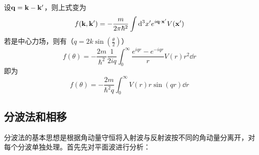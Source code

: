 \documentclass[hyperref]{ctexart}
\begin{document}
设$\vb{q}=\vb{k}-\vb{k'}$，则上式变为
\begin{equation}\label{f2}
  f(\vb{k},\vb{k'})=-\frac{m}{2\pi\hbar^2}\int\dd^3x'e^{i\vb{q}\cdot\vb{x'}}V(\vb{x'})
\end{equation}
若是中心力场，则有（$\displaystyle q=2k\sin(\frac{\theta}{2})$）
\begin{equation}\label{f3}
  f(\theta)=-\frac{2m}{\hbar^2}\frac{1}{2iq}\int_0^{\infty}\frac{e^{iqr}-e^{-iqr}}{r}V(r)r^2\dd r
\end{equation}
即为
\begin{equation}\label{f4}
  f(\theta)=-\frac{2m}{\hbar^2q}\int_0^{\infty}V(r)r\sin(qr)\dd r
\end{equation}
\subsection{分波法和相移}
分波法的基本思想是根据角动量守恒将入射波与反射波按不同的角动量分离开，对每个分波单独处理。首先先对平面波进行分析：
\end{document}
